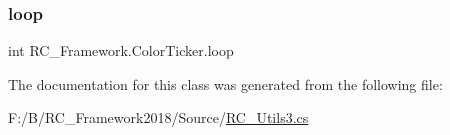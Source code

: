 \subsubsection{\texorpdfstring{loop}{loop}}
{\footnotesize\ttfamily int R\+C\+\_\+\+Framework.\+Color\+Ticker.\+loop}



The documentation for this class was generated from the following file\+:\begin{DoxyCompactItemize}
\item 
F\+:/\+B/\+R\+C\+\_\+\+Framework2018/\+Source/\mbox{\hyperlink{_r_c___utils3_8cs}{R\+C\+\_\+\+Utils3.\+cs}}\end{DoxyCompactItemize}
